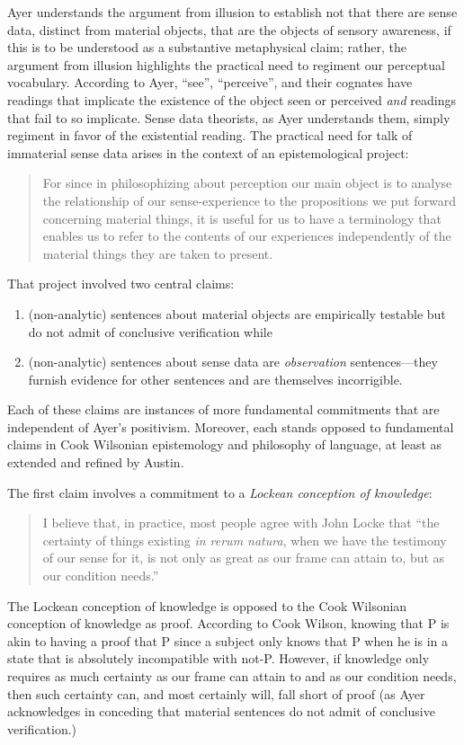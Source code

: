 \documentclass[11pt]{article}
\begin{document}
Ayer understands the argument from illusion to establish not that there are sense data, distinct from material objects, that are the objects of sensory awareness, if this is to be understood as a substantive metaphysical claim; rather, the argument from illusion highlights the practical need to regiment our perceptual vocabulary. According to Ayer, ``see'', ``perceive'', and their cognates have readings that implicate the existence of the object seen or perceived \emph{and} readings that fail to so implicate. Sense data theorists, as Ayer understands them, simply regiment in favor of the existential reading. The practical need for talk of immaterial sense data arises in the context of an epistemological project:
\begin{quote}
    For since in philosophizing about perception our main object is to analyse the relationship of our sense-experience to the propositions we put forward concerning material things, it is useful for us to have a terminology that enables us to refer to the contents of our experiences independently of the material things they are taken to present. \citep[]{Ayer:1958kx}
\end{quote}

That project involved two central claims:
\begin{enumerate}
	\item (non-analytic) sentences about material objects are empirically testable but do not admit of conclusive verification while 
	\item (non-analytic) sentences about sense data are \emph{observation} sentences---\-they furnish evidence for other sentences and are themselves incorrigible. 
\end{enumerate}
Each of these claims are instances of more fundamental commitments that are independent of Ayer's positivism. Moreover, each stands opposed to fundamental claims in Cook Wilsonian epistemology and philosophy of language, at least as extended and refined by Austin.

The first claim involves a commitment to a \emph{Lockean conception of knowledge}:
\begin{quote}
    I believe that, in practice, most people agree with John Locke that ``the certainty of things existing \emph{in rerum natura}, when we have the testimony of our sense for it, is not only as great as our frame can attain to, but as our condition needs.'' \citep[1]{Ayer:1958kx}
\end{quote}
The Lockean conception of knowledge is opposed to the Cook Wilsonian conception of knowledge as proof. According to Cook Wilson, knowing that P is akin to having a proof that P since a subject only knows that P when he is in a state that is absolutely incompatible with not-P. However, if knowledge only requires as much certainty as our frame can attain to and as our condition needs, then such certainty can, and most certainly will, fall short of proof (as Ayer acknowledges in conceding that material sentences do not admit of conclusive verification.)
\end{document}
